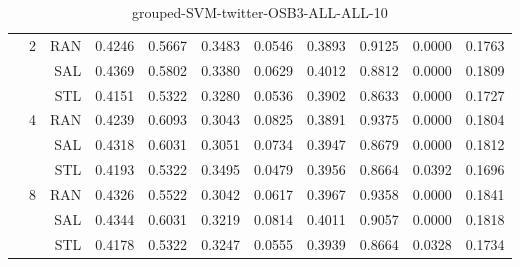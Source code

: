 \begin{center}
\begin{table}[htbp]
\begin{center}
\begin{tabular}{ | r | r | r | r | r | r | r | r | r | r | r |}
 & \multirow{3}{*}{2} & RAN & 0.4246 & 0.5667 & 0.3483 & 0.0546 & 0.3893 & 0.9125 & 0.0000 & 0.1763\\ \cline{3-11}
 &   & SAL & 0.4369 & 0.5802 & 0.3380 & 0.0629 & 0.4012 & 0.8812 & 0.0000 & 0.1809\\ \cline{3-11}
 &   & STL & 0.4151 & 0.5322 & 0.3280 & 0.0536 & 0.3902 & 0.8633 & 0.0000 & 0.1727\\ \cline{2-11}
 & \multirow{3}{*}{4} & RAN & 0.4239 & 0.6093 & 0.3043 & 0.0825 & 0.3891 & 0.9375 & 0.0000 & 0.1804\\ \cline{3-11}
 &   & SAL & 0.4318 & 0.6031 & 0.3051 & 0.0734 & 0.3947 & 0.8679 & 0.0000 & 0.1812\\ \cline{3-11}
 &   & STL & 0.4193 & 0.5322 & 0.3495 & 0.0479 & 0.3956 & 0.8664 & 0.0392 & 0.1696\\ \cline{2-11}
 & \multirow{3}{*}{8} & RAN & 0.4326 & 0.5522 & 0.3042 & 0.0617 & 0.3967 & 0.9358 & 0.0000 & 0.1841\\ \cline{3-11}
 &   & SAL & 0.4344 & 0.6031 & 0.3219 & 0.0814 & 0.4011 & 0.9057 & 0.0000 & 0.1818\\ \cline{3-11}
 &   & STL & 0.4178 & 0.5322 & 0.3247 & 0.0555 & 0.3939 & 0.8664 & 0.0328 & 0.1734\\ \cline{2-11}
\hline
\end{tabular}
\caption{grouped-SVM-twitter-OSB3-ALL-ALL-10}
\end{center}
 \end{table}
\end{center}

